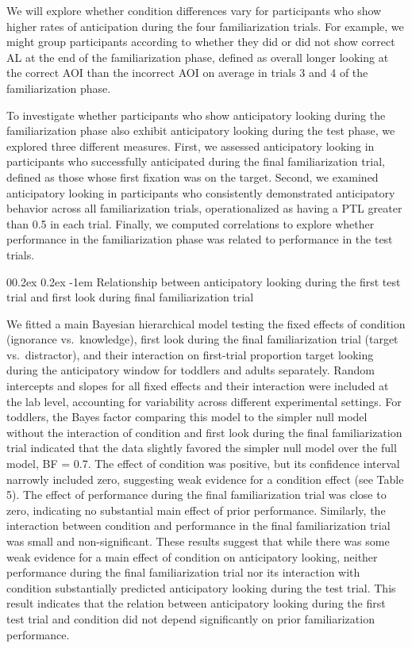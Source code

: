 \documentclass[
  man,floatsintext]{apa6}
\makeatletter
\let\oldparagraph\paragraph
\renewcommand{\paragraph}{
    \@ifstar
      \xxxParagraphStar
      \xxxParagraphNoStar
  }
\newcommand{\xxxParagraphStar}[1]{\oldparagraph*{#1}\mbox{}}
\newcommand{\xxxParagraphNoStar}[1]{\oldparagraph{#1}\mbox{}}
\renewcommand{\paragraph}{\@startsection{paragraph}{4}{\parindent}%
  {0\baselineskip \@plus 0.2ex \@minus 0.2ex}%
  {-1em}%
  {\normalfont\normalsize\bfseries\itshape\typesectitle}}
\makeatother
\begin{document}
We will explore whether condition differences vary for participants who show higher rates of anticipation during the four familiarization trials. For example, we might group participants according to whether they did or did not show correct AL at the end of the familiarization phase, defined as overall longer looking at the correct AOI than the incorrect AOI on average in trials 3 and 4 of the familiarization phase.

To investigate whether participants who show anticipatory looking during the familiarization phase also exhibit anticipatory looking during the test phase, we explored three different measures. First, we assessed anticipatory looking in participants who successfully anticipated during the final familiarization trial, defined as those whose first fixation was on the target. Second, we examined anticipatory looking in participants who consistently demonstrated anticipatory behavior across all familiarization trials, operationalized as having a PTL greater than 0.5 in each trial. Finally, we computed correlations to explore whether performance in the familiarization phase was related to performance in the test trials.

\paragraph{Relationship between anticipatory looking during the first test trial and first look during final familiarization trial}\label{relationship-between-anticipatory-looking-during-the-first-test-trial-and-first-look-during-final-familiarization-trial}

We fitted a main Bayesian hierarchical model testing the fixed effects of condition (ignorance vs.~knowledge), first look during the final familiarization trial (target vs.~distractor), and their interaction on first-trial proportion target looking during the anticipatory window for toddlers and adults separately. Random intercepts and slopes for all fixed effects and their interaction were included at the lab level, accounting for variability across different experimental settings.
For toddlers, the Bayes factor comparing this model to the simpler null model without the interaction of condition and first look during the final familiarization trial indicated that the data slightly favored the simpler null model over the full model, BF = 0.7. The effect of condition was positive, but its confidence interval narrowly included zero, suggesting weak evidence for a condition effect (see Table 5). The effect of performance during the final familiarization trial was close to zero, indicating no substantial main effect of prior performance. Similarly, the interaction between condition and performance in the final familiarization trial was small and non-significant. These results suggest that while there was some weak evidence for a main effect of condition on anticipatory looking, neither performance during the final familiarization trial nor its interaction with condition substantially predicted anticipatory looking during the test trial. This result indicates that the relation between anticipatory looking during the first test trial and condition did not depend significantly on prior familiarization performance.
\end{document}

